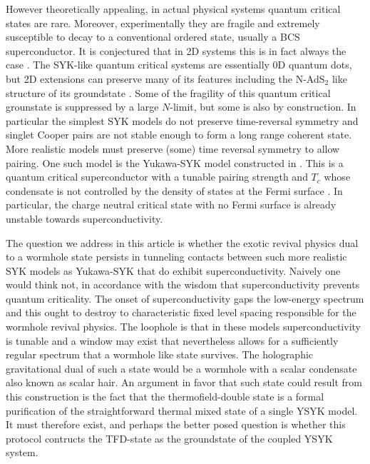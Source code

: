 However theoretically appealing, in actual physical systems quantum critical states are rare. Moreover, experimentally they are fragile and extremely susceptible to decay to a conventional ordered state, usually a BCS superconductor. It is conjectured that in 2D systems this is in fact always the case \cite{metlitskiAreNonFermiliquidsStable2015,chubukov}.
The SYK-like quantum critical systems are essentially 0D quantum dots, but 2D extensions can preserve many of its features including the N-AdS$_2$ like structure of its groundstate \cite{patel2023universal}. Some of the fragility of this quantum critical grounstate is suppressed by a large $N$-limit, but some is also by construction. In particular the simplest SYK models do not preserve time-reversal symmetry and singlet Cooper pairs are not stable enough to form a long range coherent state. More realistic models must preserve (some) time reversal symmetry to allow pairing. One such model is the Yukawa-SYK model constructed in \cite{esterlis2019cooper}. This is a quantum critical superconductor with a tunable pairing strength and $T_c$ whose condensate is not controlled by the density of states at the Fermi surface \cite{zaanen,esterlis2019cooper}. In particular, the charge neutral critical state with no Fermi surface is already unstable towards superconductivity.

The question we address in this article is whether the exotic revival physics dual to a wormhole state persists in tunneling contacts between such more realistic SYK models as Yukawa-SYK that do exhibit superconductivity. Naively one would think not, in accordance with the wisdom that superconductivity prevents quantum criticality. The onset of superconductivity gaps the low-energy spectrum and this ought to destroy to characteristic fixed level spacing responsible for the wormhole revival physics. The loophole is that in these models superconductivity is tunable and a window may exist that nevertheless allows for a sufficiently regular spectrum that a wormhole like state survives. The holographic gravitational dual of such a state would be a wormhole with a scalar condensate also known as scalar hair. An argument in favor that such state could result from this construction is the fact that the thermofield-double state is a formal purification of the straightforward thermal mixed state of a single YSYK model. It must therefore exist, and perhaps the better posed question is whether this protocol contructs the TFD-state as the groundstate of the coupled YSYK system.      

